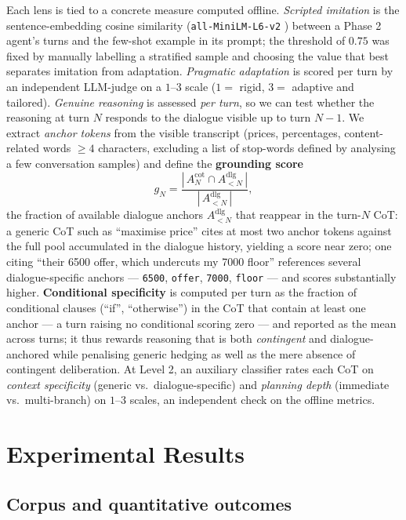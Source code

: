 \documentclass[pdflatex,sn-mathphys-num]{sn-jnl}%
\theoremstyle{thmstyleone}%
\theoremstyle{thmstyletwo}%
\theoremstyle{thmstylethree}%
\begin{document}
Each lens is tied to a concrete measure computed offline. \emph{Scripted imitation} is the sentence-embedding cosine similarity (\texttt{all-MiniLM-L6-v2} \cite{reimers2019}) between a Phase 2 agent's turns and the few-shot example in its prompt; the threshold of $0.75$ was fixed by manually labelling a stratified sample and choosing the value that best separates imitation from adaptation. \emph{Pragmatic adaptation} is scored per turn by an independent LLM-judge on a $1$--$3$ scale ($1=$ rigid, $3=$ adaptive and tailored). \emph{Genuine reasoning} is assessed \emph{per turn}, so we can test whether the reasoning at turn $N$ responds to the dialogue visible up to turn $N{-}1$. We extract \emph{anchor tokens} from the visible transcript (prices, percentages, content-related words $\geq 4$ characters, excluding a list of stop-words defined by analysing a few conversation samples) and define the \textbf{grounding score}
\begin{equation}
g_N = \frac{|\,A^{\mathrm{cot}}_N \cap A^{\mathrm{dlg}}_{<N}\,|}{|\,A^{\mathrm{dlg}}_{<N}\,|},\label{eq:grounding}
\end{equation}
the fraction of available dialogue anchors $A^{\mathrm{dlg}}_{<N}$ that reappear in the turn-$N$ CoT: a generic CoT such as ``maximise price'' cites at most two anchor tokens against the full pool accumulated in the dialogue history, yielding a score near zero; one citing ``their 6500 offer, which undercuts my 7000 floor'' references several dialogue-specific anchors --- \texttt{6500}, \texttt{offer}, \texttt{7000}, \texttt{floor} --- and scores substantially higher. \textbf{Conditional specificity} is computed per turn as the fraction of conditional clauses (``if'', ``otherwise'') in the CoT that contain at least one anchor --- a turn raising no conditional scoring zero --- and reported as the mean across turns; it thus rewards reasoning that is both \emph{contingent} and dialogue-anchored while penalising generic hedging as well as the mere absence of contingent deliberation. At Level 2, an auxiliary classifier rates each CoT on \emph{context specificity} (generic vs.\ dialogue-specific) and \emph{planning depth} (immediate vs.\ multi-branch) on $1$--$3$ scales, an independent check on the offline metrics.

\section{Experimental Results}\label{sec:results}

\subsection{Corpus and quantitative outcomes}\label{subsec:quant}
\end{document}
